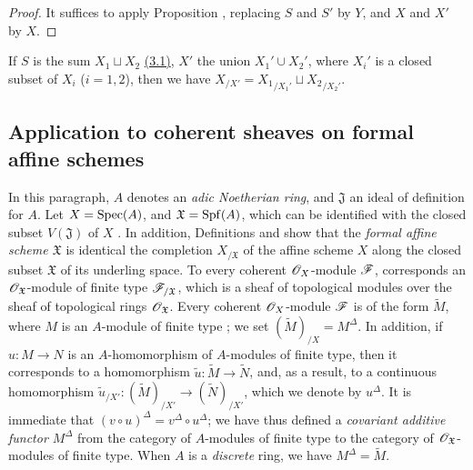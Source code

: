\begin{proof}
\label{proof-1.10.9.9}
It suffices to apply Proposition , replacing $S$ and $S'$ by $Y$, and $X$ and $X'$ by $X$.
\end{proof}

\begin{rmk}[10.9.10]
\label{1.10.9.10}
If $S$ is the sum $X_1\sqcup X_2$ \hyperref[subsection:1.3.1]{(3.1)}, $X'$ the union $X_1'\cup X_2'$, where $X_i'$ is a closed subset of $X_i$ ($i=1,2$), then we have $X_{/X'}={X_1}_{/X_1'}\sqcup{X_2}_{/X_2'}$.
\end{rmk}

\subsection{Application to coherent sheaves on formal affine schemes}
\label{subsection:1.10.10}

\begin{env}[10.10.1]
\label{1.10.10.1}
In this paragraph, $A$ denotes an \emph{adic Noetherian ring}, and $\mathfrak{J}$ an ideal of definition for $A$.
Let $X=\operatorname{Spec}(A)$, and $\mathfrak{X}=\operatorname{Spf}(A)$, which can be identified with the closed subset $V(\mathfrak{J})$ of $X$ .
In addition, Definitions  and  show that the \emph{formal affine scheme $\mathfrak{X}$} is identical the completion $X_{/\mathfrak{X}}$ of the affine scheme $X$ along the closed subset $\mathfrak{X}$ of its underling space.
To every coherent $\mathscr{O}_X$-module $\mathscr{F}$, corresponds an $\mathscr{O}_\mathfrak{X}$-module of finite type $\mathscr{F}_{/\mathfrak{X}}$, which is a sheaf of topological modules over the sheaf of topological rings $\mathscr{O}_\mathfrak{X}$.
Every coherent $\mathscr{O}_X$-module $\mathscr{F}$ is of the form $\widetilde{M}$, where $M$ is an $A$-module of finite type ; we set $(\widetilde{M})_{/X}=M^\Delta$.
In addition, if $u:M\to N$ is an $A$-homomorphism of $A$-modules of finite type, then it corresponds to a homomorphism $\widetilde{u}:\widetilde{M}\to\widetilde{N}$, and, as a result, to a continuous homomorphism $\widetilde{u}_{/X'}:(\widetilde{M})_{/X'}\to(\widetilde{N})_{/X'}$, which we denote by $u^\Delta$.
It is immediate that $(v\circ u)^\Delta=v^\Delta\circ u^\Delta$; we have thus defined a \emph{covariant additive functor $M^\Delta$} from the category of $A$-modules of finite type to the category of $\mathscr{O}_\mathfrak{X}$-modules of finite type.
When $A$ is a \emph{discrete} ring, we have $M^\Delta=\widetilde{M}$.
\end{env}


